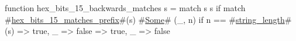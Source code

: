 function hex_bits_15_backwards_matches s = match s {
  s if match #\hyperref[sailRISCVzhexzybitszy15zymatcheszyprefix]{hex\_bits\_15\_matches\_prefix}#(s) {
    #\hyperref[sailRISCVzSome]{Some}# (_, n) if n == #\hyperref[sailRISCVzstringzylength]{string\_length}#(s) => true,
    _ => false
  } => true,
  _ => false
}

